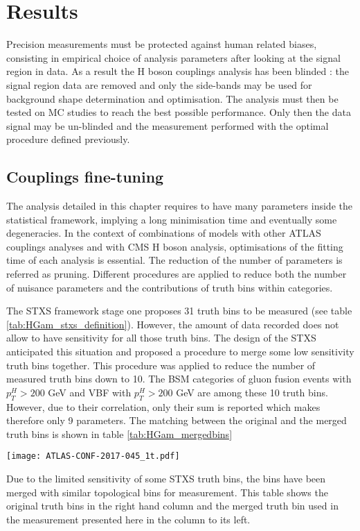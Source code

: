 \section{Results}
\label{sec:org0c76339}

Precision measurements must be protected against human related biases, consisting in empirical choice of analysis parameters after looking at the signal region in data.
As a result the H boson couplings analysis has been blinded : the signal region data are removed and only the side-bands may be used for background shape determination and optimisation.
The analysis must then be tested on MC studies to reach the best possible performance.
Only then the data signal may be un-blinded and the measurement performed with the optimal procedure defined previously.

\subsection{Couplings fine-tuning}
\label{sec:orge6e15f2}

The analysis detailed in this chapter requires to have many parameters inside the statistical framework, implying a long minimisation time and eventually some degeneracies.
In the context of combinations of models with other ATLAS couplings analyses and with CMS H boson analysis, optimisations of the fitting time of each analysis is essential.
The reduction of the number of parameters is referred as pruning.
Different procedures are applied to reduce both the number of nuisance parameters and the contributions of truth bins within categories.

The STXS framework stage one proposes 31 truth bins to be measured (see table \ref{tab:HGam_stxs_definition}).
However, the amount of data recorded does not allow to have sensitivity for all those truth bins.
The design of the STXS anticipated this situation and proposed a procedure to merge some low sensitivity truth bins together.
This procedure was applied to reduce the number of measured truth bins down to 10.
The BSM categories of gluon fusion events with $p_T^H>200$ GeV and VBF with $p_T^H>200$ GeV are among these 10 truth bins.
However, due to their correlation, only their sum is reported which makes therefore only 9 parameters.
The matching between the original and the merged truth bins is shown in table \ref{tab:HGam_mergedbins}


\begin{table}[!h]
  \begin{center}
    \texttt{[image: ATLAS-CONF-2017-045\_1t.pdf]}
    \caption{Due to the limited sensitivity of some STXS truth bins, the bins have been merged with similar topological bins for measurement. This table shows the original truth bins in the right hand column and the merged truth bin used in the measurement presented here in the column to its left.\cite{ATLAS-CONF-2017-045}}
    \label{tab:HGam_mergedbins}
  \end{center}
\end{table}

